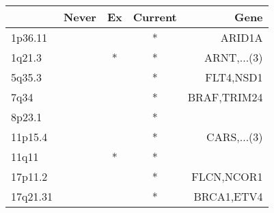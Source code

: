 \begin{tabular}{lcccr}
\toprule
{} & Never & Ex & Current &         Gene \\
\midrule
1p36.11  &       &    &       * &       ARID1A \\
1q21.3   &       &  * &       * &  ARNT,...(3) \\
5q35.3   &       &    &       * &    FLT4,NSD1 \\
7q34     &       &    &       * &  BRAF,TRIM24 \\
8p23.1   &       &    &       * &              \\
11p15.4  &       &    &       * &  CARS,...(3) \\
11q11    &       &  * &       * &              \\
17p11.2  &       &    &       * &   FLCN,NCOR1 \\
17q21.31 &       &    &       * &   BRCA1,ETV4 \\
\bottomrule
\end{tabular}
